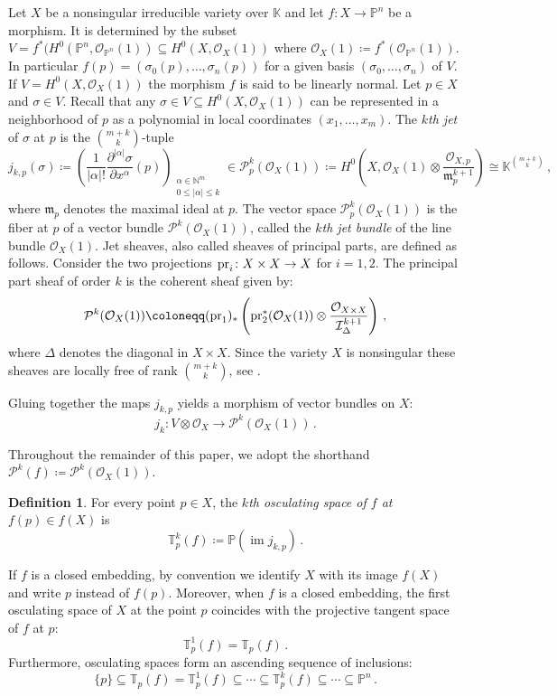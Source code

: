 \documentclass[11pt,reqno]{amsart}
\numberwithin{equation}{section}
\theoremstyle{plain}
\numberwithin{theorem}{section}
\theoremstyle{definition}
\newtheorem{definition}[theorem]{Definition}
\newcommand{\N}{\mathbb{N}}
\renewcommand{\P}{\mathbb{P}}
\newcommand{\T}{\mathbb{T}}
\newcommand{\II}{\mathcal{I}}
\newcommand{\OO}{\mathcal{O}}
\newcommand{\PP}{\mathcal{P}}
\newcommand{\K}{\mathbb{K}}
\newcommand{\pr}{{\rm pr}}
\newcommand{\image}{\operatorname{im}}
\begin{document}
Let $X$ be a nonsingular irreducible variety over $\K$ and let $f\colon X\to\P^n$ be a morphism.
It is determined by the subset $V=f^*(H^0(\P^n,\OO_{\P^n}(1))\subseteq H^0(X,\OO_X(1))$ where $\OO_X(1)\coloneqq f^*(\OO_{\P^n}(1)).$ In particular $f(p)=(\sigma_0(p),\dots,\sigma_n(p))$ for a given basis $(\sigma_0,\dots,\sigma_n)$ of $V.$ 
If $V=H^0(X,\OO_X(1))$ the morphism $f$ is said to be linearly normal.
Let $p\in X$ and $\sigma\in V$. Recall that any $\sigma\in V\subseteq H^0(X,\OO_X(1))$ can be represented in a neighborhood of $p$ as a polynomial in local coordinates $(x_1,\dots,x_m)$.
The {\em $k$th jet} of $\sigma$ at $p$ is the $\binom{m+k}{k}$-tuple
\[
j_{k,p}(\sigma)\coloneqq\left(\frac{1}{|\alpha|!}\frac{\partial^{|\alpha|}\sigma}{\partial x^\alpha}(p)\right)_{\substack{\alpha\in\N^m\\0\le|\alpha|\le k}}\in \PP^k_p(\OO_X(1))\coloneqq H^0\left(X,\OO_X(1)\otimes\frac{\OO_{X,p}}{\mathfrak{m}_{p}^{k+1}}\right)\cong \K^{\binom{m+k}{k}}\,,
\]
where $\mathfrak{m}_p$ denotes the maximal ideal at $p$. The vector space $\PP^k_p(\OO_X(1))$ is the fiber at $p$ of a vector bundle $\PP^k(\OO_X(1))$, called the {\em $k$th jet bundle} of the line bundle $\OO_X(1)$. Jet sheaves, also called sheaves of principal parts, are defined as follows. Consider the two projections $\pr_i\colon X\times X\to X$ for $i=1,2.$ The principal part sheaf of order $k$ is the coherent sheaf given by:
\[
\PP^k(\OO_X(1)) \coloneqq (\pr_1)_*\left(\pr_2^*(\OO_X(1))\otimes \frac{\OO_{X\times X}}{\II_{\Delta}^{k+1}}\right)\,,
\]
where $\Delta$ denotes the diagonal in $X\times X.$  Since the variety $X$ is nonsingular these sheaves are locally free of rank $\binom{m+k}{k}$, see \cite[\S 16]{grothendieck1967elements}.

Gluing together the maps $j_{k,p}$ yields a morphism of vector bundles on $X$:
\begin{equation}\label{eq: morphism jk}
j_k\colon V\otimes\OO_X\to \PP^k(\OO_X(1))\,.
\end{equation}

Throughout the remainder of this paper, we adopt the shorthand $\PP^k(f) \coloneqq \PP^k(\OO_X(1)).$

\begin{definition}\label{def: osculating space}
For every point $p\in X$, the {\em $k$th osculating space of $f$ at $f(p)\in f(X)$} is
\[
\T_p^k(f) \coloneqq \P(\image j_{k,p})\,.
\]
\end{definition}
If $f$ is a closed embedding, by convention we identify $X$ with its image $f(X)$ and write $p$ instead of $f(p)$. Moreover, when $f$ is a closed embedding, the first osculating space of $X$ at the point $p$ coincides with the projective tangent space of $f$ at $p$:
\[
\T_p^1(f) = \T_p(f)\,.
\]
Furthermore, osculating spaces form an ascending sequence of inclusions:
\begin{equation}\label{eq: osc seq}
    \{p\} \subseteq \T_p(f)  = \T_p^1(f) \subseteq \cdots \subseteq \T_p^k(f) \subseteq \cdots \subseteq \P^n\,.
\end{equation}
\end{document}
